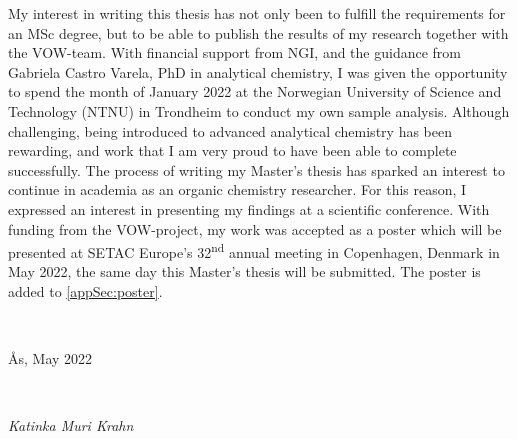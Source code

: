 My interest in writing this thesis has not only been to fulfill the requirements for an MSc degree, but to be able to publish the results of my research together with the VOW-team. With financial support from NGI, and the guidance from Gabriela Castro Varela, PhD in analytical chemistry, I was given the opportunity to spend the month of January 2022 at the Norwegian University of Science and Technology (NTNU) in Trondheim to conduct my own sample analysis. Although challenging, being introduced to advanced analytical chemistry has been rewarding, and work that I am very proud to have been able to complete successfully. The process of writing my Master's thesis has sparked an interest to continue in academia as an organic chemistry researcher. For this reason, I expressed an interest in presenting my findings at a scientific conference. With funding from the VOW-project, my work was accepted as a poster which will be presented at SETAC Europe's 32\textsuperscript{nd} annual meeting in Copenhagen, Denmark in May 2022, the same day this Master's thesis will be submitted. The poster is added to \cref{appSec:poster}.  

~\\
\centerline{Ås, May 2022} \\
\centerline{\textit{Katinka Muri Krahn}}



